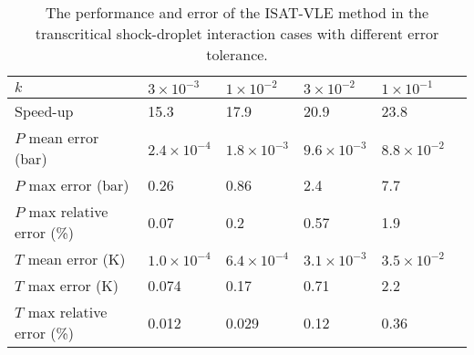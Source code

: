 \begin{table}%
\caption{The performance and error of the ISAT-VLE method in the transcritical shock-droplet interaction cases with different error tolerance.}\label{droplet_FC_table}
\begin{tabular*}{0.8\textwidth}{@{} l|lllll@{} }
\toprule
$k$                         & $3\times 10^{-3}$    & $1\times 10^{-2}$    &$3\times 10^{-2}$    & $1\times 10^{-1}$\\
\midrule
Speed-up                    & 15.3                 & 17.9                 & 20.9                &  23.8\\
$P$ mean error (bar)        & $2.4\times 10^{-4}$  & $1.8\times 10^{-3}$  & $9.6\times 10^{-3}$ & $8.8\times 10^{-2}$\\
$P$ max error (bar)         & 0.26                 & 0.86                 & 2.4                 & 7.7 \\
$P$ max relative error (\%) & 0.07                 & 0.2                  & 0.57                & 1.9 \\
$T$ mean error (K)          & $1.0\times 10^{-4}$  & $6.4\times 10^{-4}$  & $3.1\times 10^{-3}$ & $3.5\times 10^{-2}$\\
$T$ max error (K)           & 0.074                & 0.17                 & 0.71                & 2.2\\
$T$ max relative error (\%) & 0.012                & 0.029                & 0.12                & 0.36 \\
\bottomrule
\end{tabular*}
\end{table}

